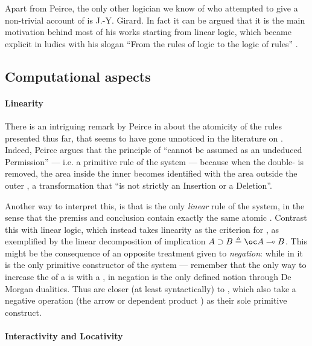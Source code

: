 \begin{scope}
\begin{scope}
Apart from Peirce, the only other logician we know of who attempted to give a
non-trivial account of  is J.-Y. Girard. In fact it can
be argued that it is the main motivation behind most of his works starting from
linear logic, which became explicit in ludics with his slogan ``From the rules
of logic to the logic of rules'' .

\subsection{Computational aspects}

\paragraph{Linearity}

There is an intriguing remark by Peirce in
\cite[pp.~536--537]{peirce_prolegomena_1906} about the atomicity of the rules
presented thus far, that seems to have gone unnoticed in the literature on
. Indeed, Peirce argues that the principle of  ``cannot
be assumed as an undeduced Permission'' --- i.e. a primitive rule of the system
--- because when the double- is removed, the area inside the inner
 becomes identified with the area outside the outer , a
transformation that ``is not strictly an Insertion or a Deletion''.

Another way to interpret this, is that  is the only
\emph{linear} rule of the system, in the sense that the premiss and conclusion
contain exactly the same atomic . Contrast this with linear logic,
which instead takes linearity as the criterion for , as
exemplified by the linear decomposition of implication $A \limp B \defeq \oc A
\multimap B$. This might be the consequence of an opposite treatment given to
\emph{negation}: while in  it is the only primitive constructor of the
system --- remember that the only way to increase the  of a 
is with a , in  negation is the only defined notion through De
Morgan dualities. Thus  are closer (at least syntactically) to
\emph{}, which also take a negative operation (the arrow or
dependent product ) as their sole primitive construct.

\paragraph{Interactivity and Locativity}


\end{scope}
\end{scope}
